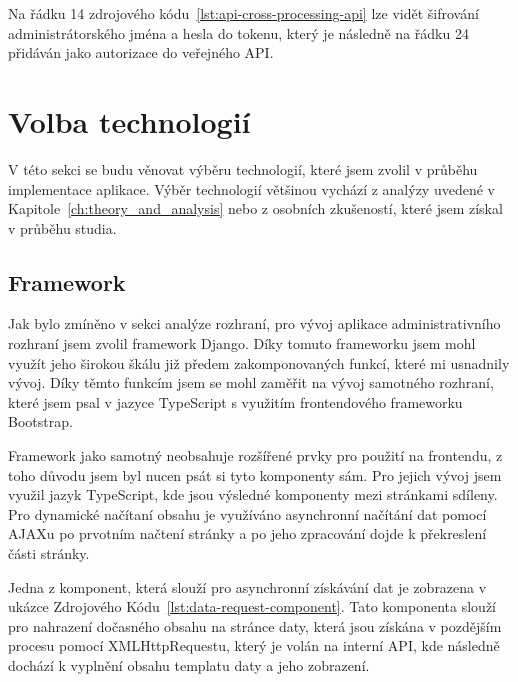 Na řádku 14 zdrojového kódu~\ref{lst:api-cross-processing-api} lze vidět šifrování administrátorského jména a hesla do tokenu, který je následně na řádku 24 přidáván jako autorizace do veřejného API.
\pagebreak




\section{Volba technologií}
\label{sec:implementation-technologies}
V této sekci se budu věnovat výběru technologií, které jsem zvolil v průběhu implementace aplikace. Výběr technologií většinou vychází z analýzy uvedené v Kapitole~\ref{ch:theory_and_analysis} nebo z osobních zkušeností, které jsem získal v průběhu studia.

\subsection{Framework}
\label{subsec:implementation-technologies-framework}
Jak bylo zmíněno v sekci analýze rozhraní, pro vývoj aplikace administrativního rozhraní jsem zvolil framework Django. Díky tomuto frameworku jsem mohl využít jeho širokou škálu již předem zakomponovaných funkcí, které mi usnadnily vývoj. Díky těmto funkcím jsem se mohl zaměřit na vývoj samotného rozhraní, které jsem psal v jazyce TypeScript s využitím frontendového frameworku Bootstrap.

Framework jako samotný neobsahuje rozšířené prvky pro použití na frontendu, z toho důvodu jsem byl nucen psát si tyto komponenty sám. Pro jejich vývoj jsem využil jazyk TypeScript, kde jsou výsledné komponenty mezi stránkami sdíleny. Pro dynamické načítaní obsahu je využíváno asynchronní načítání dat pomocí AJAXu po prvotním načtení stránky a po jeho zpracování dojde k překreslení části stránky.

Jedna z komponent, která slouží pro asynchronní získávání dat je zobrazena v ukázce Zdrojového Kódu~\ref{lst:data-request-component}. Tato komponenta slouží pro nahrazení dočasného obsahu na stránce daty, která jsou získána v pozdějším procesu pomocí XMLHttpRequestu, který je volán na interní API, kde následně dochází k vyplnění obsahu templatu daty a jeho zobrazení.

